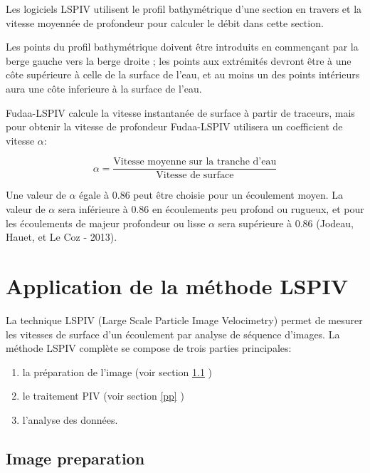 \documentclass[
]{article}
\begin{document}
Les logiciels LSPIV utilisent le profil bathymétrique d'une section en travers et la vitesse moyennée de profondeur pour calculer le débit dans cette section.

Les points du profil bathymétrique doivent être introduits en commençant par la berge gauche vers la berge droite ; les points aux extrémités devront être à une côte supérieure à celle de la surface de l'eau, et au moins un des points intérieurs aura une côte inferieure à la surface de l'eau.

Fudaa-LSPIV calcule la vitesse instantanée de surface à partir de traceurs, mais pour obtenir la vitesse de profondeur Fudaa-LSPIV utilisera un coefficient de vitesse \(\alpha\):

\begin{equation}
\alpha =  \frac{\text{Vitesse moyenne sur la tranche d'eau}}{\text{Vitesse de surface}}
\end{equation}

Une valeur de \(\alpha\) égale à 0.86 peut être choisie pour un écoulement moyen. La valeur de \(\alpha\) sera inférieure à 0.86 en écoulements peu profond ou rugueux, et pour les écoulements de majeur profondeur ou lisse \(\alpha\) sera supérieure à 0.86 (Jodeau, Hauet, et Le Coz - 2013). \citep{hauet_application_2013}

\hypertarget{appendix-appendix}{%
\appendix}


\hypertarget{application-de-la-muxe9thode-lspiv}{%
\section{Application de la méthode LSPIV}\label{application-de-la-muxe9thode-lspiv}}

La technique LSPIV (Large Scale Particle Image Velocimetry) permet de
mesurer les vitesses de surface d'un écoulement par analyse de séquence
d'images. La méthode LSPIV complète se compose de trois parties
principales:

\begin{enumerate}
\def\labelenumi{\arabic{enumi}.}
\item
  la préparation de l'image (voir section \ref{ip} )
\item
  le traitement PIV (voir section \ref{pp} )
\item
  l'analyse des données.
\end{enumerate}

\hypertarget{ip}{%
\subsection{Image preparation}\label{ip}}
\end{document}
